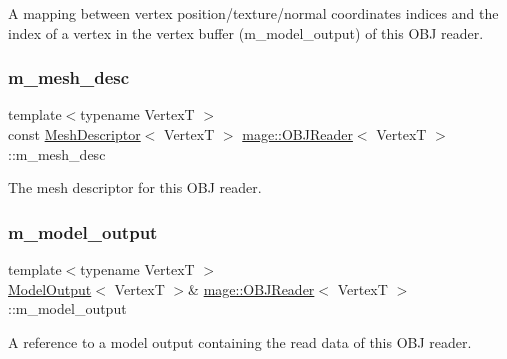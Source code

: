 A mapping between vertex position/texture/normal coordinates\textquotesingle{} indices and the index of a vertex in the vertex buffer ({\ttfamily m\+\_\+model\+\_\+output}) of this O\+BJ reader. \hypertarget{classmage_1_1_o_b_j_reader_a4b5810a694e2223de437e62bba748bc8}{}\label{classmage_1_1_o_b_j_reader_a4b5810a694e2223de437e62bba748bc8} 
\subsubsection{\texorpdfstring{m\+\_\+mesh\+\_\+desc}{m\_mesh\_desc}}
{\footnotesize\ttfamily template$<$typename VertexT $>$ \\
const \hyperlink{structmage_1_1_mesh_descriptor}{Mesh\+Descriptor}$<$ VertexT $>$ \hyperlink{classmage_1_1_o_b_j_reader}{mage\+::\+O\+B\+J\+Reader}$<$ VertexT $>$\+::m\+\_\+mesh\+\_\+desc\hspace{0.3cm}{\ttfamily [private]}}

The mesh descriptor for this O\+BJ reader. \hypertarget{classmage_1_1_o_b_j_reader_ad4691c59a3e3ecefd201a8f03528bbd8}{}\label{classmage_1_1_o_b_j_reader_ad4691c59a3e3ecefd201a8f03528bbd8} 
\subsubsection{\texorpdfstring{m\+\_\+model\+\_\+output}{m\_model\_output}}
{\footnotesize\ttfamily template$<$typename VertexT $>$ \\
\hyperlink{structmage_1_1_model_output}{Model\+Output}$<$ VertexT $>$\& \hyperlink{classmage_1_1_o_b_j_reader}{mage\+::\+O\+B\+J\+Reader}$<$ VertexT $>$\+::m\+\_\+model\+\_\+output\hspace{0.3cm}{\ttfamily [private]}}

A reference to a model output containing the read data of this O\+BJ reader. \hypertarget{classmage_1_1_o_b_j_reader_a1032eb4a6844a99f1d96fc17c3e52aee}{}\label{classmage_1_1_o_b_j_reader_a1032eb4a6844a99f1d96fc17c3e52aee} 
